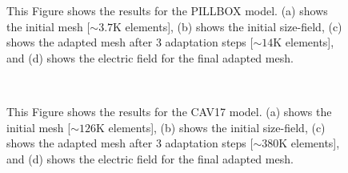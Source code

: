 \documentclass[review,12pt]{elsarticle_summary_report}
\begin{document}
\begin{landscape}
\begin{figure}[ph!]
\caption{\label{pill} This Figure shows the results for the PILLBOX model. (a) shows the initial mesh [$\sim3.7\text{K}$ elements], (b) shows the initial size-field, (c) shows the adapted mesh after 3 adaptation steps [$\sim14\text{K}$ elements], and (d) shows the electric field for the final adapted mesh.}
\end{figure}
\end{landscape}
\begin{landscape}
\begin{figure}[ph!]
\centering
{}
\hspace*{50pt}
\\
\hspace*{50pt}
\caption{\label{cav} This Figure shows the results for the CAV17 model. (a) shows the initial mesh [$\sim126\text{K}$ elements], (b) shows the initial size-field, (c) shows the adapted mesh after 3 adaptation steps [$\sim380\text{K}$ elements], and (d) shows the electric field for the final adapted mesh.}
\end{figure}
\end{landscape}
\end{document}
